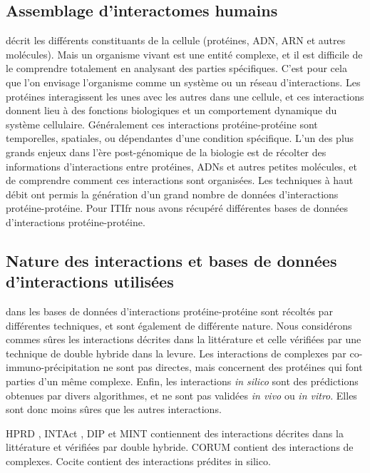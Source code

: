 		\subsection{\textcolor{green!45!black}{Assemblage d'interactomes humains}}
			 décrit les différents constituants de la cellule (protéines, \acs{ADN}, \acs{ARN} et autres molécules). Mais un organisme vivant est une entité complexe, et il est difficile de le comprendre totalement en analysant des parties spécifiques. C'est pour cela que l'on envisage l'organisme comme un système ou un réseau d'interactions.
			Les protéines interagissent les unes avec les autres dans une cellule, et ces interactions donnent lieu à des fonctions biologiques et un comportement dynamique du système cellulaire. Généralement ces interactions protéine-protéine sont temporelles, spatiales, ou dépendantes d'une condition spécifique.
			L'un des plus grands enjeux dans l'ère post-génomique de la biologie est de récolter des informations d'interactions entre protéines, \acsp{ADN} et autres petites molécules, et de comprendre comment ces interactions sont organisées.
			Les techniques à haut débit ont permis la génération d'un grand nombre de données d'interactions protéine-protéine.
			Pour \acs{ITIfr} nous avons récupéré différentes bases de données d'interactions protéine-protéine.

		\subsection{\textcolor{green!45!black}{Nature des interactions et bases de données d'interactions utilisées}}
			 dans les bases de données d'interactions protéine-protéine sont récoltés par différentes techniques, et sont également de différente nature.
			Nous considérons commes sûres les interactions décrites dans la littérature et celle vérifiées par une technique de double hybride dans la levure.
			Les interactions de complexes par co-immuno-précipitation ne sont pas directes, mais concernent des protéines qui font parties d'un même complexe.
			Enfin, les interactions \emph{in silico} sont des prédictions obtenues par divers algorithmes, et ne sont pas validées \emph{in vivo} ou \emph{in vitro}.
			Elles sont donc moins sûres que les autres interactions. 

			\pagebreak

			\ac{HPRD} \citep{Prasad2009}, INTAct \citep{Kerrien2012}, \ac{DIP} \citep{Xenarios2000} et \ac{MINT} \citep{Zanzoni2002} contiennent des interactions décrites dans la littérature et vérifiées par double hybride.
			\ac{CORUM} \citep{Ruepp2008} contient des interactions de complexes.
			Cocite \citep{Ramani2005} contient des interactions prédites in silico.



